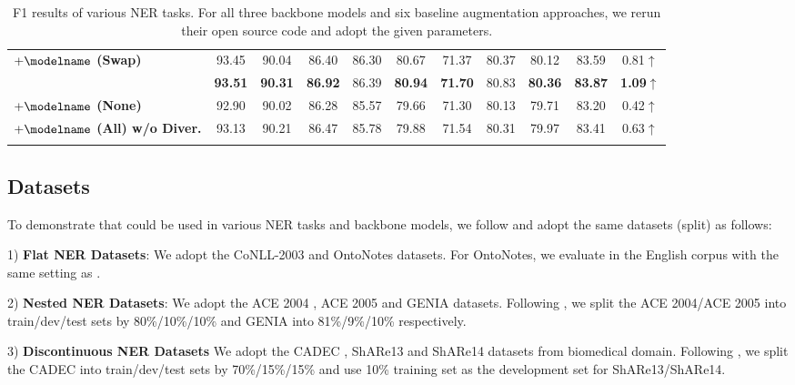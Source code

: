 \begin{table*}[th!]
{\begin{tabular}{lcccccccccc}
\multicolumn{1}{l}{\textbf{$+\modelname$ (Swap)}} &93.45 &90.04 &86.40 &86.30 &80.67 &71.37 &80.37 &80.12  &83.59 &\color{red}0.81$\uparrow$ \\
\rowcolor{gray!10}
\multicolumn{1}{l}{\textbf{$+\modelname$ (All)}} &\textbf{93.51} &\textbf{90.31} &\textbf{86.92} &86.39 &\textbf{80.94} &\textbf{71.70} &80.83 &\textbf{80.36}  &\textbf{83.87} &\color{red}\textbf{1.09}$\uparrow$ \\
\cmidrule{2-11} 
\multicolumn{1}{l}{\textbf{$+\modelname$ (None)}} &92.90 &90.02 &86.28 &85.57 &79.66 &71.30 &80.13 &79.71  &83.20 &\color{red}0.42$\uparrow$ \\
\multicolumn{1}{l}{\textbf{$+\modelname$ (All) w/o Diver.}} &93.13 &90.21 &86.47 &85.78 &79.88 &71.54 &80.31 &79.97  &83.41 &\color{red}0.63$\uparrow$ \\

\thickhline

\end{tabular}}
\caption{F1 results of various NER tasks. For all three backbone models and six baseline augmentation approaches, we rerun their open source code and adopt the given parameters.}
\label{tab:verification}

\vspace{-4mm}
\end{table*}\subsection{Datasets}
To demonstrate that {\modelname} could be used in various NER tasks and backbone models, we follow \citet{yan-etal-2021-unified-generative,li2022unified} and adopt the same datasets (split) as follows:

1) \textbf{Flat NER Datasets}: We adopt the CoNLL-2003 \cite{sang2003introduction} and OntoNotes \cite{pradhan2013towards} datasets. For OntoNotes, we evaluate in the English corpus with the same setting as \citet{yan-etal-2021-unified-generative}.

2) \textbf{Nested NER Datasets}: We adopt the ACE 2004 \cite{doddington2004automatic}, ACE 2005 \cite{Walker2005Ace} and GENIA \cite{kim2003genia} datasets. Following \citet{yan-etal-2021-unified-generative}, we split the ACE 2004/ACE 2005 into train/dev/test sets by 80\%/10\%/10\% and GENIA into 81\%/9\%/10\% respectively.

3) \textbf{Discontinuous NER Datasets}
We adopt the CADEC \cite{karimi2015cadec}, ShARe13 \cite{Mowery2013Task1S} and ShARe14 \cite{Mowery2014Task2S} datasets from biomedical domain. Following \citet{yan-etal-2021-unified-generative}, we split the CADEC into train/dev/test sets by 70\%/15\%/15\% and use 10\% training set as the development set for ShARe13/ShARe14.

